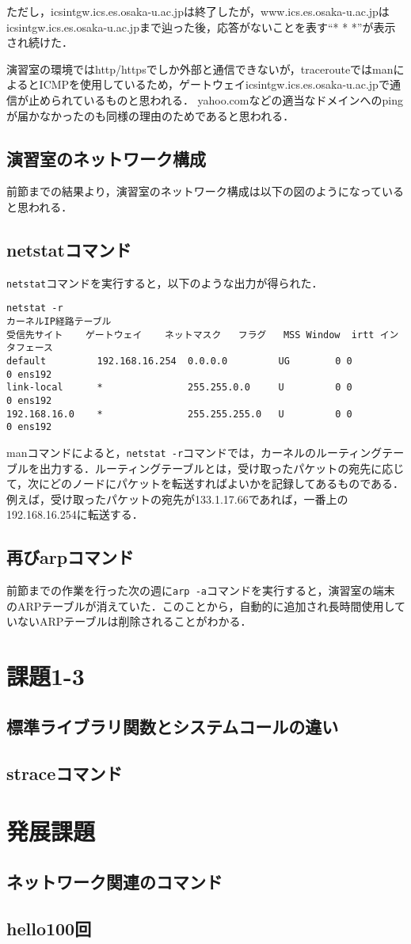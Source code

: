 \documentclass[a4j,10pt,titlepage]{jsarticle}
\begin{document}
ただし，icsintgw.ics.es.osaka-u.ac.jpは終了したが，www.ics.es.osaka-u.ac.jpはicsintgw.ics.es.osaka-u.ac.jpまで辿った後，応答がないことを表す``* * *''が表示され続けた．

演習室の環境ではhttp/httpsでしか外部と通信できないが，tracerouteではmanによるとICMPを使用しているため，ゲートウェイicsintgw.ics.es.osaka-u.ac.jpで通信が止められているものと思われる．
yahoo.comなどの適当なドメインへのpingが届かなかったのも同様の理由のためであると思われる．

\subsection{演習室のネットワーク構成}
前節までの結果より，演習室のネットワーク構成は以下の図のようになっていると思われる．


\subsection{netstatコマンド}
\verb|netstat|コマンドを実行すると，以下のような出力が得られた．
\begin{verbatim}
netstat -r
カーネルIP経路テーブル
受信先サイト    ゲートウェイ    ネットマスク   フラグ   MSS Window  irtt インタフェース
default         192.168.16.254  0.0.0.0         UG        0 0          0 ens192
link-local      *               255.255.0.0     U         0 0          0 ens192
192.168.16.0    *               255.255.255.0   U         0 0          0 ens192
\end{verbatim}
manコマンドによると，\verb|netstat -r|コマンドでは，カーネルのルーティングテーブルを出力する．ルーティングテーブルとは，受け取ったパケットの宛先に応じて，次にどのノードにパケットを転送すればよいかを記録してあるものである．例えば，受け取ったパケットの宛先が133.1.17.66であれば，一番上の192.168.16.254に転送する．

\subsection{再びarpコマンド}
前節までの作業を行った次の週に\verb|arp -a|コマンドを実行すると，演習室の端末のARPテーブルが消えていた．このことから，自動的に追加され長時間使用していないARPテーブルは削除されることがわかる．

\section{課題1-3}
\subsection{標準ライブラリ関数とシステムコールの違い}


\subsection{straceコマンド}
\section{発展課題}
\subsection{ネットワーク関連のコマンド}
\subsection{hello100回}
\end{document}

